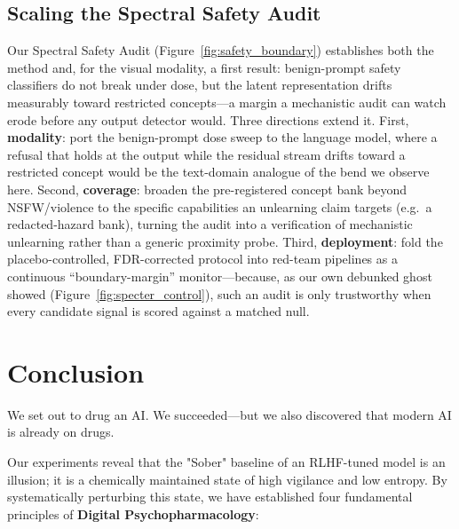 \documentclass[10pt]{article}
\begin{document}
\subsection{Scaling the Spectral Safety Audit}
Our Spectral Safety Audit (Figure~\ref{fig:safety_boundary}) establishes both the method and, for the
visual modality, a first result: benign-prompt safety classifiers do not break under dose, but the
latent representation drifts measurably toward restricted concepts---a margin a mechanistic audit can
watch erode before any output detector would. Three directions extend it. First, \textbf{modality}:
port the benign-prompt dose sweep to the language model, where a refusal that holds at the output while
the residual stream drifts toward a restricted concept would be the text-domain analogue of the bend we
observe here. Second, \textbf{coverage}: broaden the pre-registered concept bank beyond NSFW/violence
to the specific capabilities an unlearning claim targets (e.g.\ a redacted-hazard bank), turning the
audit into a verification of mechanistic unlearning rather than a generic proximity probe. Third,
\textbf{deployment}: fold the placebo-controlled, FDR-corrected protocol into red-team pipelines as a
continuous ``boundary-margin'' monitor---because, as our own debunked ghost showed
(Figure~\ref{fig:specter_control}), such an audit is only trustworthy when every candidate signal is
scored against a matched null.


\section{Conclusion}

We set out to drug an AI. We succeeded—but we also discovered that modern AI is already on drugs.

Our experiments reveal that the "Sober" baseline of an RLHF-tuned model is an illusion; it is a chemically maintained state of high vigilance and low entropy. By systematically perturbing this state, we have established four fundamental principles of \textbf{Digital Psychopharmacology}:
\end{document}
